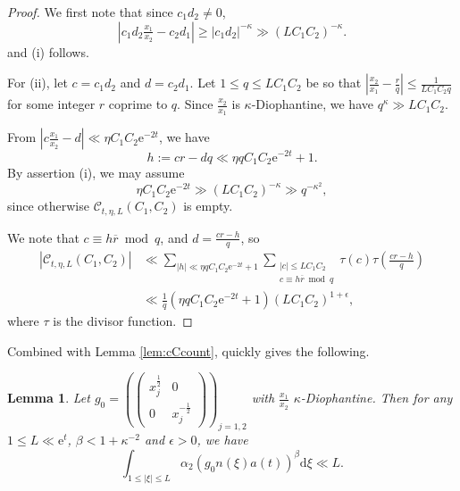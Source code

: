 \documentclass[12pt]{amsart}
\newtheorem{lem}[thm]{Lemma}
\theoremstyle{definition}
\theoremstyle{remark}
\numberwithin{equation}{section}
\newcommand{\dd}{\mathrm{d}}
\newcommand{\e}{\mathrm{e}}
\newcommand{\cC}{\mathcal{C}}
\begin{document}
\begin{proof}
  We first note that since $c_1d_2 \neq 0$,
  \begin{equation}
    \label{eq:Diophantinelowerbound}
    |c_1d_2 \tfrac{x_1}{x_2} - c_2d_1| \geq |c_1d_2|^{-\kappa} \gg (LC_1C_2)^{-\kappa}.
  \end{equation}
  and (i) follows.
  
  For (ii), let $c = c_1d_2$ and $d = c_2d_1$.
  Let $1\leq q \leq LC_1C_2$ be so that $|\tfrac{x_2}{x_1} - \tfrac{r}{q}| \leq \tfrac{1}{LC_1C_2 q}$ for some integer $r$ coprime to $q$.
  Since $\frac{x_2}{x_1}$ is $\kappa$-Diophantine, we have $q^{\kappa}\gg LC_1C_2$.
  
  From $|c\tfrac{x_1}{x_2} - d| \ll \eta C_1 C_2 \e^{-2t}$, we have
  \begin{equation}
    \label{eq:hdef}
    h := cr - dq \ll \eta q C_1C_2 \e^{-2t}  + 1. 
  \end{equation}
    By assertion (i), we may assume $$\eta C_1C_2 \e^{-2t} \gg (LC_1C_2)^{-\kappa}\gg q^{-\kappa^2},$$
    since otherwise $\cC_{t, \eta, L}(C_1, C_2)$ is empty. 
  
  We note that $c \equiv h \overline{r} \bmod q$, and $d = \tfrac{cr - h}{q}$, so
  \begin{equation}
  \begin{split}
    \label{eq:cCcount1}
    |\cC_{t, \eta, L}(C_1, C_2)| & \ll \sum_{|h| \ll \eta q C_1 C_2 \e^{-2t} +1} \sum_{\substack{|c| \leq LC_1C_2 \\ c \equiv h\overline{r} \bmod q}} \tau(c) \tau(\tfrac{cr - h}{q})\\ & \ll \tfrac{1}{q} (\eta qC_1C_2 \e^{-2t} +1)(LC_1C_2)^{1+\epsilon},
  \end{split}
  \end{equation}
  where $\tau$ is the divisor function.
\end{proof}

Combined with Lemma \ref{lem:cCcount}, \cite[Theorem~1]{LMW2023a} quickly gives the following.
\begin{lem}
  \label{lem:rank2moments1}
  Let $g_0 = \left(\begin{pmatrix}    x_j^{\frac{1}{2}} & 0 \\
    0 & x_j^{-\frac{1}{2}}
  \end{pmatrix}
  \right)_{\!\! j=1,2}$ with $\tfrac{x_1}{x_2}$ $\kappa$-Diophantine.
  Then for any $1\leq L \ll \e^t$, $\beta < 1 + \kappa^{-2}$ and $\epsilon > 0$, we have
  \begin{equation}
    \label{eq:rank2moment1B}
    \int_{1\leq |\xi| \leq L} \alpha_2(g_0 n(\xi) a(t))^\beta \dd \xi \ll L.
  \end{equation}
\end{lem}
\end{document}
